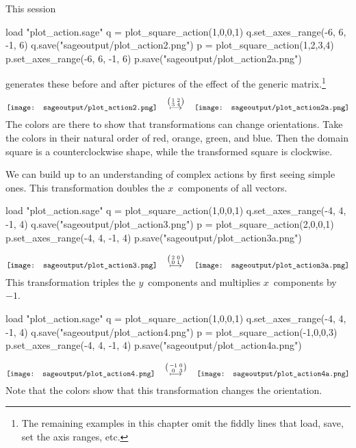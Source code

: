 This \Sage{} session
\begin{sageoutput}
load "plot_action.sage"
q = plot_square_action(1,0,0,1) 
q.set_axes_range(-6, 6, -1, 6) 
q.save("sageoutput/plot_action2.png")
p = plot_square_action(1,2,3,4) 
p.set_axes_range(-6, 6, -1, 6) 
p.save("sageoutput/plot_action2a.png")
\end{sageoutput}
\noindent generates these before and 
after pictures of the effect of the generic  
matrix.\footnote{The remaining examples in this chapter omit the 
fiddly lines that load, save, set the axis ranges, etc.}
\begin{equation*}
  \vcenteredhbox{\texttt{[image: sageoutput/plot\_action2.png]}}
  \quad\mapsunder{\big (\begin{smallmatrix} 1 &2 \\ 3 &4 \end{smallmatrix}\big )}\quad
  \vcenteredhbox{\texttt{[image: sageoutput/plot\_action2a.png]}}
\end{equation*}
The colors are there to show that transformations can change
orientations.
Take the colors in their natural order of red, orange, 
green, and blue.
Then the domain square is a counterclockwise shape, while the transformed
square is clockwise.

We can build up to an understanding of complex actions by 
first seeing simple ones.
This transformation doubles the $x$~components of all vectors. 
\begin{sageoutput}[d,0,4;d,5,7]
load "plot_action.sage"
q = plot_square_action(1,0,0,1) 
q.set_axes_range(-4, 4, -1, 4) 
q.save("sageoutput/plot_action3.png")
p = plot_square_action(2,0,0,1) 
p.set_axes_range(-4, 4, -1, 4) 
p.save("sageoutput/plot_action3a.png")
\end{sageoutput}
\begin{equation*}
  \vcenteredhbox{\texttt{[image: sageoutput/plot\_action3.png]}}
  \quad\mapsunder{\big (\begin{smallmatrix} 2 &0 \\ 0 &1 \end{smallmatrix}\big )}\quad
  \vcenteredhbox{\texttt{[image: sageoutput/plot\_action3a.png]}}
\end{equation*}
This transformation triples the $y$~components and multiplies 
$x$~components by $-1$. 
\begin{sageoutput}[d,0,4;d,5,7]
load "plot_action.sage"
q = plot_square_action(1,0,0,1) 
q.set_axes_range(-4, 4, -1, 4) 
q.save("sageoutput/plot_action4.png")
p = plot_square_action(-1,0,0,3) 
p.set_axes_range(-4, 4, -1, 4) 
p.save("sageoutput/plot_action4a.png")
\end{sageoutput}
\begin{equation*}
  \vcenteredhbox{\texttt{[image: sageoutput/plot\_action4.png]}}
  \quad\mapsunder{\big (\begin{smallmatrix} -1 &0 \\ 0 &3 \end{smallmatrix}\big )}\quad
  \vcenteredhbox{\texttt{[image: sageoutput/plot\_action4a.png]}}
\end{equation*}
Note that the colors show that this transformation changes
the orientation.

